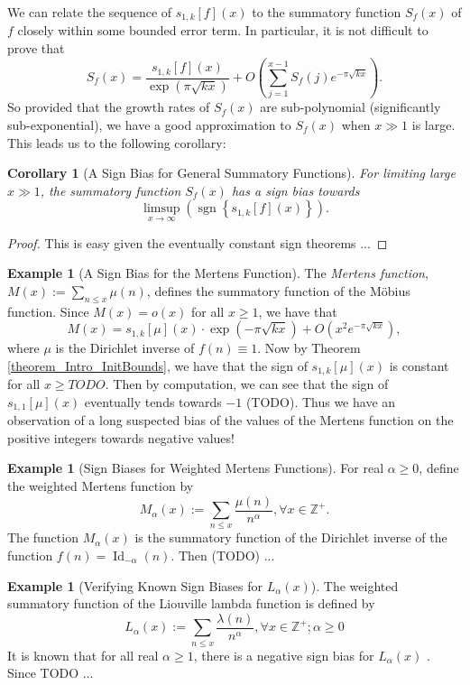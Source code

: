 \documentclass[11pt,reqno]{amsart}
\numberwithin{figure}{section}
\numberwithin{table}{section}
\DeclareMathOperator{\sgn}{sgn}
\theoremstyle{plain}
\newtheorem{cor}[theorem]{Corollary}
\numberwithin{theorem}{section}
\theoremstyle{definition}
\newtheorem{example}[theorem]{Example}
\begin{document}
We can relate the sequence of $s_{1,k}[f](x)$ to the summatory function $S_f(x)$ of $f$ closely within 
some bounded error term. In particular, it is not difficult to prove that 
\[
S_f(x) = \frac{s_{1,k}[f](x)}{\exp(\pi\sqrt{kx})} + O\left(\sum_{j=1}^{x-1} S_f(j) e^{-\pi\sqrt{kx}}\right). 
\]
So provided that the growth rates of $S_f(x)$ are sub-polynomial (significantly sub-exponential), we have a good 
approximation to $S_f(x)$ when $x \gg 1$ is large. This leads us to the following corollary: 

\begin{cor}[A Sign Bias for General Summatory Functions]
For limiting large $x \gg 1$, the summatory function $S_f(x)$ has a sign bias towards 
\[
\limsup_{x \rightarrow \infty} \left(\sgn\left\{s_{1,k}[f](x)\right\}\right). 
\]
\end{cor}
\begin{proof}
This is easy given the eventually constant sign theorems ... 
\end{proof} 

\begin{example}[A Sign Bias for the Mertens Function]
The \emph{Mertens function}, $M(x) := \sum_{n \leq x} \mu(n)$, defines the summatory function of the 
M\"obius function. Since $M(x) = o(x)$ for all $x \geq 1$, we have that 
\[
M(x) = s_{1,k}[\mu](x) \cdot \exp(-\pi\sqrt{kx}) + O\left(x^2 e^{-\pi\sqrt{kx}}\right), 
\]
where $\mu$ is the Dirichlet inverse of $f(n) \equiv 1$. 
Now by Theorem \ref{theorem_Intro_InitBounds}, we have that the 
sign of $s_{1,k}[\mu](x)$ is constant for all 
$x \geq TODO$. Then by computation, we can see that the sign of $s_{1,1}[\mu](x)$ eventually 
tends towards $-1$ (TODO). Thus we have an observation of a long suspected bias of the values of the 
Mertens function on the positive integers towards negative values!
\end{example} 

\begin{example}[Sign Biases for Weighted Mertens Functions]
For real $\alpha \geq 0$, define the weighted Mertens function by 
\[
M_{\alpha}(x) := \sum_{n \leq x} \frac{\mu(n)}{n^{\alpha}}, \forall x \in \mathbb{Z}^{+}. 
\]
The function $M_{\alpha}(x)$ is the summatory function of the Dirichlet inverse of the function 
$f(n) = \operatorname{Id}_{-\alpha}(n)$. Then (TODO) ... 
\end{example} 

\begin{example}[Verifying Known Sign Biases for $L_{\alpha}(x)$]
The weighted summatory function of the Liouville lambda function is defined by 
\[
L_{\alpha}(x) := \sum_{n \leq x} \frac{\lambda(n)}{n^{\alpha}}, 
     \forall x \in \mathbb{Z}^{+}; \alpha \geq 0
\]
It is known that for all real $\alpha \geq 1$, there is a negative sign bias for $L_{\alpha}(x)$ 
\cite{TODO}. 
Since TODO ... 
\end{example} 
\end{document}
